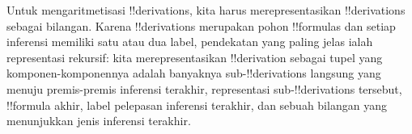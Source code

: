 \documentclass[../../../include/open-logic-section]{subfiles}
\begin{document}

\begin{explain}
Untuk mengaritmetisasi !!{derivation}s, kita harus merepresentasikan
!!{derivation}s sebagai bilangan. Karena !!{derivation}s merupakan pohon
!!{formula}s dan setiap inferensi memiliki satu atau dua label, pendekatan yang
paling jelas ialah representasi rekursif: kita merepresentasikan
!!{derivation} sebagai tupel
yang komponen-komponennya adalah banyaknya sub-!!{derivation}s langsung yang
menuju premis-premis inferensi terakhir, representasi sub-!!{derivation}s
tersebut, !!{formula} akhir, label pelepasan inferensi terakhir, dan sebuah
bilangan yang menunjukkan jenis inferensi terakhir.
\end{explain}
\end{document}
